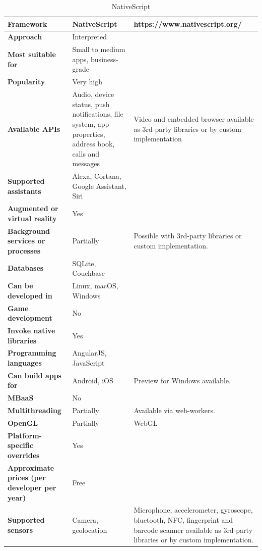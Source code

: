 \documentclass[english,master,public,dept460,male,cpdeclaration,oneside]{diploma}
\begin{document}
\begin{table}[!h]
	\centering
	\caption{NativeScript}
	\begin{tabular}{p{} | p{} | p{}}
		\toprule		
		\textbf{Framework} & \textbf{NativeScript} & https://www.nativescript.org/ \\
		\midrule
		\textbf{Approach} & Interpreted & \\			
		\midrule	
		\textbf{Most suitable for} & Small to medium apps, business-grade & \\
		\midrule
		\textbf{Popularity} & Very high & \\			
		\midrule
		\textbf{Available APIs} & Audio, device status, push notifications, file system, app properties, address book, calls and messages & Video and embedded browser available as 3rd-party libraries or by custom implementation \\			
		\midrule
		\textbf{Supported assistants} & Alexa, Cortana, Google Assistant, Siri & \\			
		\midrule
		\textbf{Augmented or virtual reality} & Yes & \\			
		\midrule
		\textbf{Background services or processes} & Partially & Possible with 3rd-party libraries or custom implementation. \\			
		\midrule
		\textbf{Databases} & SQLite, Couchbase & \\			
		\midrule
		\textbf{Can be developed in} & Linux, macOS, Windows &  \\			
		\midrule
		\textbf{Game development} & No & \\			
		\midrule
		\textbf{Invoke native libraries} & Yes & \\			
		\midrule
		\textbf{Programming languages} & AngularJS, JavaScript & \\			
		\midrule
		\textbf{Can build apps for} & Android, iOS & Preview for Windows available. \\			
		\midrule
		\textbf{MBaaS} & No & \\			
		\midrule
		\textbf{Multithreading} & Partially & Available via web-workers. \\			
		\midrule
		\textbf{OpenGL} & Partially & WebGL \\			
		\midrule
		\textbf{Platform-specific overrides} & Yes & \\			
		\midrule
		\textbf{Approximate prices (per developer per year)} & Free &  \\			
		\midrule
		\textbf{Supported sensors} & Camera, geolocation & Microphone, accelerometer, gyroscope, bluetooth, NFC, fingerprint and barcode scanner available as 3rd-party libraries or by custom implementation.\\			
		\midrule
	\end{tabular}
\end{table}
\end{document}

